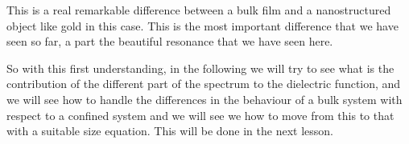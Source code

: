 \documentclass[../main/main.tex]{subfiles}
\begin{document}
This is a real remarkable difference between a bulk film and a nanostructured object like gold in this case. This is the most important difference that we have seen so far, a part the beautiful resonance that we have seen here.

So with this first understanding, in the following we will try to see what is the contribution of the different part of the spectrum to the dielectric function, and we will see how to handle the differences in the behaviour of a bulk system with respect to a confined system and we will see we how to move from this to that with a suitable size equation. This will be done in the next lesson.





\clearpage
\end{document}
